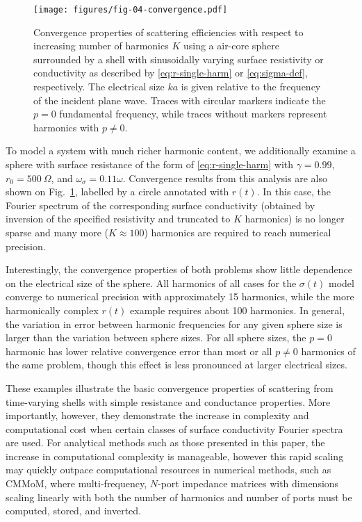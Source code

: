\documentclass[article]{IEEEtran}
\begin{document}
\begin{figure}
    \centering
    \texttt{[image: figures/fig-04-convergence.pdf]}
    \caption{Convergence properties of scattering efficiencies with respect to increasing number of harmonics $K$ using a air-core sphere surrounded by a shell with 
    sinusoidally varying surface resistivity or conductivity as described by \eqref{eq:r-single-harm} or \eqref{eq:sigma-def}, respectively.  The electrical size $ka$ is given relative to the frequency of the incident plane wave. Traces with circular markers indicate the $p = 0$ fundamental frequency, while traces without markers represent harmonics with $p\neq 0$. } 
    \label{fig:conv-s0-easy}
\end{figure}

To model a system with much richer harmonic content, we additionally examine a sphere with surface resistance of the form of \eqref{eq:r-single-harm} with $\gamma = 0.99$, $r_0 = 500~\Omega$, and $\omega_\sigma = 0.11\omega$.  Convergence results from this analysis are also shown on Fig.~\ref{fig:conv-s0-easy}, labelled by a circle annotated with $r(t)$. In this case, the Fourier spectrum of the corresponding surface conductivity (obtained by inversion of the specified resistivity and truncated to $K$ harmonics) is no longer sparse and many more ($K\approx 100$) harmonics are required to reach numerical precision.  

Interestingly, the convergence properties of both problems show little dependence on the electrical size of the sphere. All harmonics of all cases for the $\sigma(t)$ model converge to numerical precision with approximately 15 harmonics, while the more harmonically complex $r(t)$ example requires about 100 harmonics. In general, the variation in error between harmonic frequencies for any given sphere size is larger than the variation between sphere sizes. For all sphere sizes, the $p=0$ harmonic has lower relative convergence error than most or all $p\neq 0$ harmonics of the same problem, though this effect is less pronounced at larger electrical sizes.

These examples illustrate the basic convergence properties of scattering from time-varying shells with simple resistance and conductance properties.  More importantly, however, they demonstrate the increase in complexity and computational cost when certain classes of surface conductivity Fourier spectra are used.  For analytical methods such as those presented in this paper, the increase in computational complexity is manageable, however this rapid scaling may quickly outpace computational resources in numerical methods, such as CMMoM, where multi-frequency, $N$-port impedance matrices with dimensions scaling linearly with both the number of harmonics and number of ports must be computed, stored, and inverted.
\end{document}
